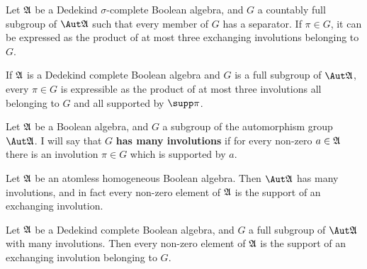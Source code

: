  Let $\frak A$ be a Dedekind $\sigma$-complete
Boolean algebra, and $G$ a countably full subgroup of $\Aut\frak A$ such
that every member of $G$ has a separator.   If $\pi\in G$, it can be
expressed as the product of at most three exchanging involutions
belonging to $G$.


 If $\frak A$ is a Dedekind complete Boolean
algebra and $G$ is a full subgroup of $\Aut\frak A$, every $\pi\in G$
is expressible as the product
of at most three involutions all belonging to $G$ and all supported by
$\supp\pi$.


 Let $\frak A$ be a Boolean algebra, and $G$ a
subgroup of the automorphism group $\Aut\frak A$.   I will say that $G$
{\bf has many involutions} if for every non-zero $a\in\frak A$ there is
an involution $\pi\in G$ which is supported by $a$.

 Let $\frak A$ be an atomless homogeneous Boolean
algebra.   Then $\Aut\frak A$ has many involutions, and in fact every
non-zero element of $\frak A$ is the support of an exchanging
involution.


 Let $\frak A$ be a Dedekind complete Boolean
algebra, and $G$ a full subgroup of $\Aut\frak A$ with many involutions.
Then every non-zero element of $\frak A$ is the support of an
exchanging involution belonging to $G$.

